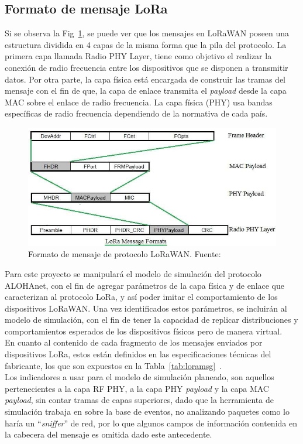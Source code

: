 \begin{justify}
\subsection{Formato de mensaje LoRa}
Si se observa la Fig~\ref{fig:msg}, se puede ver que los mensajes en LoRaWAN poseen una estructura dividida en 4 capas de la misma forma que la pila del protocolo. La primera capa llamada Radio PHY Layer, tiene como objetivo el realizar la conexión de radio frecuencia entre los dispositivos que se disponen a transmitir datos. Por otra parte, la capa física está encargada de construir las tramas del mensaje con el fin de que, la capa de enlace transmita el \textit{payload} desde la capa MAC sobre el enlace de radio frecuencia. La capa física (PHY) usa bandas específicas de radio frecuencia dependiendo de la normativa de cada país\cite{Sornin}.\\
\begin{figure}[!ht]
\includegraphics[scale=0.4]{images/LoRa-message-formats}
\caption{Formato de mensaje de protocolo LoRaWAN. Fuente:~\cite{Sornin}}
\label{fig:msg}
\end{figure}
\noindent
Para este proyecto se manipulará el modelo de simulación del protocolo ALOHAnet, con el fin de agregar parámetros de la capa física y de enlace que caracterizan al protocolo LoRa, y así poder imitar el comportamiento de los dispositivos LoRaWAN. Una vez identificados estos parámetros, se incluirán al modelo de simulación, con el fin de tener la capacidad de replicar distribuciones y comportamientos esperados de los dispositivos físicos pero de manera virtual.\\
En cuanto al contenido de cada fragmento de los mensajes enviados por dispositivos LoRa, estos están definidos en las especificaciones técnicas del fabricante, los que son expuestos en la Tabla~\ref{tab:loramsg}~\cite{Sornin}.\\
Los indicadores a usar para el modelo de simulación planeado, son aquellos pertenecientes a la capa RF PHY, a la capa PHY \textit{payload} y la capa MAC \textit{payload}, sin contar tramas de capas superiores, dado que la herramienta de simulación trabaja en sobre la base de eventos, no analizando paquetes como lo haría un ``\textit{sniffer}'' de red, por lo que algunos campos de información contenida en la cabecera del mensaje es omitida dado este antecedente.

\end{justify}
